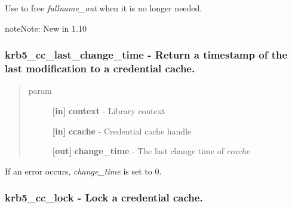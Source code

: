 \documentclass[letterpaper,10pt,english]{sphinxmanual}
\begin{document}
Use {\hyperref[appdev/refs/api/krb5_free_string:krb5_free_string]{}} to free \emph{fullname\_out} when it is no longer needed.

\begin{notice}{note}{Note:}
New in 1.10
\end{notice}


\subsubsection{krb5\_cc\_last\_change\_time -  Return a timestamp of the last modification to a credential cache.}
\label{appdev/refs/api/krb5_cc_last_change_time:krb5-cc-last-change-time-return-a-timestamp-of-the-last-modification-to-a-credential-cache}\label{appdev/refs/api/krb5_cc_last_change_time::doc}

\begin{fulllineitems}
\label{appdev/refs/api/krb5_cc_last_change_time:krb5_cc_last_change_time}
\end{fulllineitems}

\begin{quote}\begin{description}
\item[{param}] \leavevmode
\textbf{{[}in{]}} \textbf{context} - Library context

\textbf{{[}in{]}} \textbf{ccache} - Credential cache handle

\textbf{{[}out{]}} \textbf{change\_time} - The last change time of \emph{ccache}

\end{description}\end{quote}

If an error occurs, \emph{change\_time} is set to 0.


\subsubsection{krb5\_cc\_lock -  Lock a credential cache.}
\label{appdev/refs/api/krb5_cc_lock:krb5-cc-lock-lock-a-credential-cache}\label{appdev/refs/api/krb5_cc_lock::doc}
\end{document}
